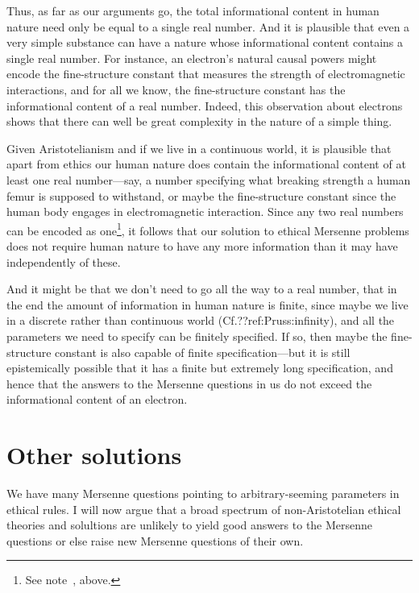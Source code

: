 Thus, as far as our arguments go, the total informational content in human nature need only be equal to a single real number. And it is plausible that even a very simple substance can have a nature whose informational content contains a 
single real number. For instance, an electron's natural causal powers might encode the fine-structure constant 
that measures the strength of electromagnetic interactions, and for all we know, the fine-structure constant has
the informational content of a real number. Indeed, this observation about electrons shows
that there can well be great complexity in the nature of a simple thing.

Given Aristotelianism and if we live in a continuous world, it is plausible that apart from ethics our 
human nature does contain the informational content of at least one real number---say, a number specifying 
what breaking strength a human femur is supposed to withstand, or maybe the fine-structure constant since the human
body engages in electromagnetic interaction. Since any two real numbers can be encoded as one\footnote{See note~\cite{fn:encode}, above.}, it follows that
our solution to ethical Mersenne problems does not require human nature to have any more information than it 
may have independently of these. 

And it might be that we don't need to go all the way to a real number, that in the end the amount of information in
human nature is finite, since maybe we live in a discrete rather than continuous world (Cf.??ref:Pruss:infinity), and
all the parameters we need to specify can be finitely specified. If so, then maybe the fine-structure constant is also
capable of finite specification---but it is still epistemically possible that it has a finite but extremely long specification, and hence that the answers to the Mersenne questions in us do not exceed the informational content
of an electron.

\section{Other solutions}
We have many Mersenne questions pointing to arbitrary-seeming parameters in ethical rules.
I will now argue that a broad spectrum of non-Aristotelian ethical theories and solultions are unlikely to yield good answers to the Mersenne questions
or else raise new Mersenne questions of their own.

